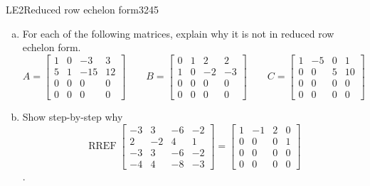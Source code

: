 \begin{exercise}{LE2}{Reduced row echelon form}{3245} 
\begin{exerciseStatement} 

\begin{enumerate}[(a)]
\item  

 For each of the following matrices, explain why it is not in reduced row echelon form. \[
                            A = \left[\begin{array}{cccc}
1 & 0 & -3 & 3 \\
5 & 1 & -15 & 12 \\
0 & 0 & 0 & 0 \\
0 & 0 & 0 & 0
\end{array}\right] \hspace{2em}
                            B = \left[\begin{array}{cccc}
0 & 1 & 2 & 2 \\
1 & 0 & -2 & -3 \\
0 & 0 & 0 & 0 \\
0 & 0 & 0 & 0
\end{array}\right] \hspace{2em}
                            C = \left[\begin{array}{cccc}
1 & -5 & 0 & 1 \\
0 & 0 & 5 & 10 \\
0 & 0 & 0 & 0 \\
0 & 0 & 0 & 0
\end{array}\right] \hspace{2em}
                        \hspace{2em}
                    \] 

 
\item  

 Show step-by-step why \[\operatorname{RREF}\left[\begin{array}{cccc}
-3 & 3 & -6 & -2 \\
2 & -2 & 4 & 1 \\
-3 & 3 & -6 & -2 \\
-4 & 4 & -8 & -3
\end{array}\right]=\left[\begin{array}{cccc}
1 & -1 & 2 & 0 \\
0 & 0 & 0 & 1 \\
0 & 0 & 0 & 0 \\
0 & 0 & 0 & 0
\end{array}\right]\]. 

 
\end{enumerate}


\end{exerciseStatement}
\end{exercise}
